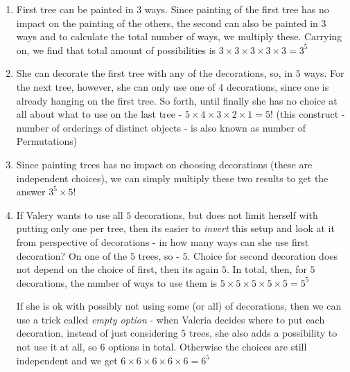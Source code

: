 \begin{problem}
\begin{enumerate}
\item First tree can be painted in $3$ ways. Since painting of the first tree has no impact on the painting of the others, the second can also be painted in $3$ ways and to calculate the total  number of ways, we multiply these. Carrying on, we find that total amount of possibilities is $3\times3\times3\times3\times3 = 3^5$
\item She can decorate the first tree with any of the decorations, so, in $5$ ways. For the next tree, however, she can only use one of $4$ decorations, since one is already hanging on the first tree. So forth, until finally she has no choice at all about what to use on the last tree - $5\times 4\times 3\times 2\times 1 = 5!$ (this construct - number of orderings of distinct objects - is also known as number of Permutations)
\item Since painting trees has no impact on choosing decorations (these are independent choices), we can simply multiply these two results to get the answer $3^5\times 5!$
\item If Valery wants to use all $5$ decorations, but does not limit herself with putting only one per tree, then its easier to \textit{invert} this setup and look at it from perspective of decorations - in how many ways can she use first decoration? On one of the $5$ trees, so - $5$. Choice for second decoration does not depend on the choice of first, then its again $5$. In total, then, for $5$ decorations, the number of ways to use them is $5\times 5\times 5\times 5\times 5=5^5$

If she is ok with possibly not using some (or all) of decorations, then we can use a trick called \textit{empty option} - when Valeria decides where to put each decoration, instead of just considering $5$ trees, she also adds a possibility to not use it at all, so $6$ options in total. Otherwise the choices are still independent and we get $6 \times 6\times 6\times 6\times 6 = 6^5$
\end{enumerate}
\end{problem}
%
\filbreak
